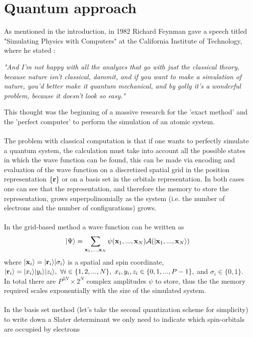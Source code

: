 \section{Quantum approach}
As mentioned in the introduction, in 1982 Richard Feynman gave a speech titled "Simulating Physics with Computers" at the California Institute of Technology, where he stated \cite{Feynman1982Jun}:
\begin{displayquote}
    \textit{"And I'm not happy with all the analyzes that go with just the classical theory, because nature isn't classical, dammit, and if you want to make a simulation of nature, you'd better make it quantum mechanical, and by golly it's a wonderful problem, because it doesn't look so easy."}
\end{displayquote}
This thought was the beginning of a massive research for the 'exact method' and the 'perfect computer' to perform the simulation of an atomic system. \\
\\
The problem with classical computation is that if one wants to perfectly simulate a quantum system, the calculation must take into account all the possible states in which the wave function can be found, this can be made via encoding and evaluation of the wave function on a discretized spatial grid in the position representation $\{ {\bf r} \} $ or on a basis set in the orbitals representation. In both cases one can see that the representation, and therefore the memory to store the representation, grows superpolinomially as the system (i.e. the number of electrons and the number of configurations) grows. \\
\\
In the grid-based method a wave function can be written as
\begin{equation}
    |\Psi\rangle = \sum_{{\bf x}_1,...,{\bf x}_N} \psi({\bf x}_1,...,{\bf x}_N) \mathcal{A} (|{\bf x}_1,...,{\bf x}_N\rangle)
\end{equation}
where $|{\bf x}_i\rangle = |{\bf r}_i\rangle |\sigma_i\rangle$ is a spatial and spin coordinate, $|{\bf r}_i\rangle = |x_i\rangle |y_i\rangle |z_i\rangle, \ \forall i \in \{1,2,...,N\}, \ x_i,y_i,z_i \in \{0,1,...,P-1\},$ and $\sigma_i \in \{0,1\}$. In total there are $P^{3N} \times 2^N$ complex amplitudes $\psi$ to store, thus the the memory required scales exponentially with the size of the simulated system. \\
\\
In the basis set method (let's take the second quantization scheme for simplicity) to write down a Slater determinant we only need to indicate which spin-orbitals are occupied by electrons

